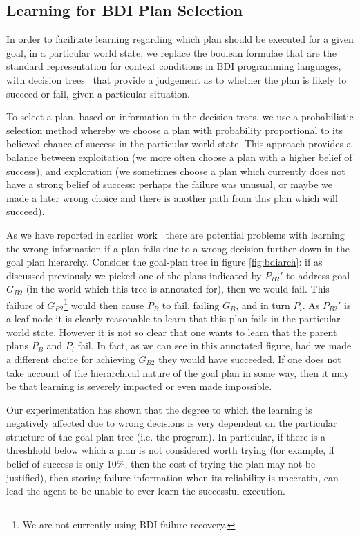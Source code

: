 \subsection{Learning for BDI Plan Selection}
In order to facilitate learning regarding which plan should be
executed for a given goal, in a particular world state, we replace the
boolean formulae that are the standard representation for context
conditions in BDI programming languages, with decision
trees~\cite{Mitchell97:ML} that provide a judgement as to whether the
plan is likely to succeed or fail, given a particular situation. 

To select a plan, based on information in the decision trees, we use a
probabilistic selection method whereby we choose a plan with
probability proportional to its believed chance of success in the
particular world state. This approach provides a balance between
exploitation (we more often choose a plan with a higher belief of
success), and exploration (we sometimes choose a plan which currently
does not have a strong belief of success: perhaps the failure was
unusual, or maybe we made a later wrong choice and there is another
path from this plan which will succeed).

As we have reported in earlier work~\cite{Airiau:IJAT:09} there are
potential problems with learning the wrong information if a plan fails
due to a wrong decision further down in the goal plan
hierarchy. Consider the goal-plan tree in figure \ref{fig:bdiarch}: if
as discussed previously we picked one of the  plans indicated by
$P_{B2}'$ to address goal 
$G_{B2}$ (in the world which this tree is annotated for), then we
would fail. This failure of $G_{B2}$\footnote{We are not currently
using BDI failure recovery.} would then cause $P_B$ to fail, failing
$G_B$, and in turn $P_i$. As $P_{B2}'$ is a leaf node it is clearly
reasonable to learn that this plan fails in the particular world
state. However it is not so clear that one wants to learn that the
parent plans $P_B$ and $P_i$ fail. In fact, as we can see in this
annotated figure, had we made a different choice for achieving
$G_{B2}$ they would have succeeded. If one does not take account of
the hierarchical nature of the goal plan in some way, then it may be
that learning is severely impacted or even made impossible.

Our experimentation has shown that the degree to which the learning is
negatively affected due to wrong decisions is very dependent on
the particular structure of the goal-plan tree (i.e. the
program). In particular, if there is a threshhold below which a plan
is not considered worth trying (for example, if belief of success is
only 10\%, then the cost of trying the plan may not be justified),
then storing failure information when its reliability is unceratin,
can lead the agent to be unable to ever learn the successful
execution. 

